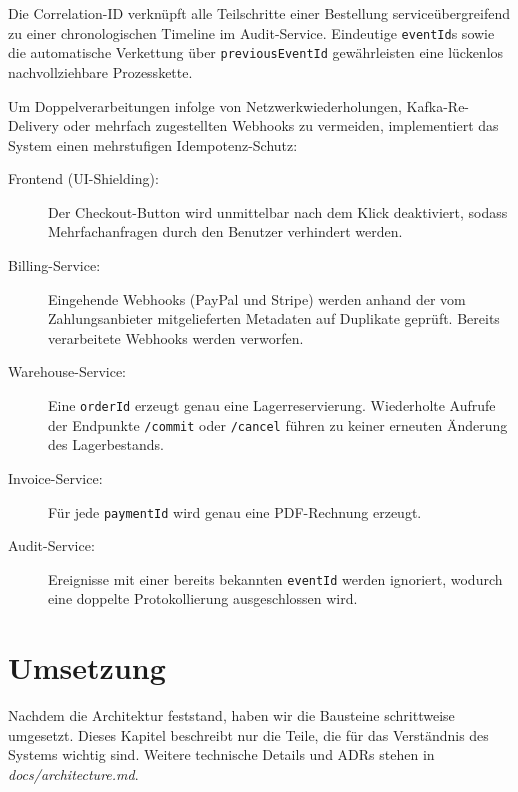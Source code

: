 \documentclass[
  11pt,
  a4paper,
  oneside,
  headings=normal,
  parskip=half,
  DIV=12
]{scrreprt}
\begin{document}
Die Correlation-ID verknüpft alle Teilschritte einer Bestellung serviceübergreifend zu einer chronologischen Timeline im Audit-Service. Eindeutige \texttt{eventId}s sowie die automatische Verkettung über \texttt{previousEventId} gewährleisten eine lückenlos nachvollziehbare Prozesskette.

Um Doppelverarbeitungen infolge von Netzwerkwiederholungen, Kafka-Re-Delivery oder mehrfach zugestellten Webhooks zu vermeiden, implementiert das System einen mehrstufigen Idempotenz-Schutz:

\begin{description}
    \item[Frontend (UI-Shielding):]
    Der Checkout-Button wird unmittelbar nach dem Klick deaktiviert, sodass Mehrfachanfragen durch den Benutzer verhindert werden.

    \item[Billing-Service:]
    Eingehende Webhooks (PayPal und Stripe) werden anhand der vom Zahlungsanbieter mitgelieferten Metadaten auf Duplikate geprüft. Bereits verarbeitete Webhooks werden verworfen.

    \item[Warehouse-Service:]
    Eine \texttt{orderId} erzeugt genau eine Lagerreservierung. Wiederholte Aufrufe der Endpunkte \texttt{/commit} oder \texttt{/cancel} führen zu keiner erneuten Änderung des Lagerbestands.

    \item[Invoice-Service:]
    Für jede \texttt{paymentId} wird genau eine PDF-Rechnung erzeugt.

    \item[Audit-Service:]
    Ereignisse mit einer bereits bekannten \texttt{eventId} werden ignoriert, wodurch eine doppelte Protokollierung ausgeschlossen wird.
\end{description}


\chapter{Umsetzung}

Nachdem die Architektur feststand, haben wir die Bausteine schrittweise
umgesetzt. Dieses Kapitel beschreibt nur die Teile, die für das Verständnis des
Systems wichtig sind. Weitere technische Details und ADRs stehen in
\emph{docs/architecture.md}.
\end{document}
